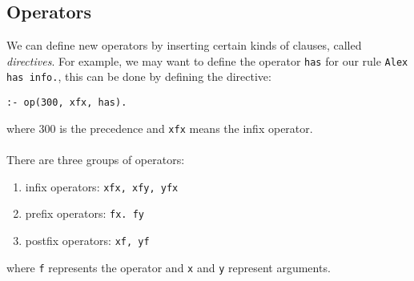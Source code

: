 \documentclass[11pt]{article}
\begin{document}
\subsection{Operators}
We can define new operators by inserting certain kinds of clauses, called \emph{directives}. For example, we may want to define the operator \texttt{has} for our rule \texttt{Alex has info.},
this can be done by defining the directive:
\begin{lstlisting}
:- op(300, xfx, has).
\end{lstlisting}
where 300 is the precedence and \texttt{xfx} means the infix operator.\\\\
There are three groups of operators:
\begin{enumerate}
\item infix operators: \texttt{xfx, xfy, yfx}
\item prefix operators: \texttt{fx. fy}
\item postfix operators: \texttt{xf, yf}
\end{enumerate}
where \texttt{f} represents the operator and \texttt{x} and \texttt{y} represent arguments.
\end{document}
